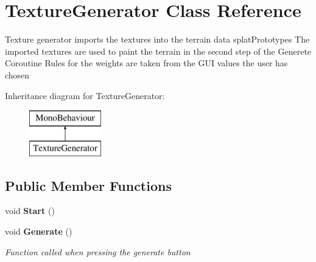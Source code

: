 \section{Texture\+Generator Class Reference}
\label{class_texture_generator}


Texture generator imports the textures into the terrain data splat\+Prototypes The imported textures are used to paint the terrain in the second step of the Generete Coroutine Rules for the weights are taken from the G\+UI values the user has chosen  


Inheritance diagram for Texture\+Generator\+:\begin{figure}[H]
\begin{center}
\leavevmode
\includegraphics[height=2.000000cm]{class_texture_generator}
\end{center}
\end{figure}
\subsection*{Public Member Functions}
\begin{DoxyCompactItemize}
\item 
void \textbf{ Start} ()
\item 
void \textbf{ Generate} ()
\begin{DoxyCompactList}\small\item\em Function called when pressing the generate button \end{DoxyCompactList}\end{DoxyCompactItemize}
